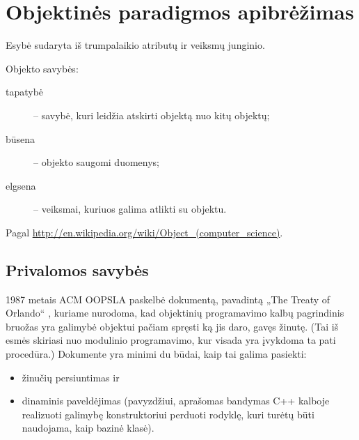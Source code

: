 \chapter{Objektinės paradigmos apibrėžimas}

\begin{defn}[Objektas]
  Esybė sudaryta iš trumpalaikio atributų ir veiksmų junginio.

  Objekto savybės:
  \begin{description}
    \item[tapatybė] – savybė, kuri leidžia atskirti objektą nuo kitų
      objektų;
    \item[būsena] – objekto saugomi duomenys;
    \item[elgsena] – veiksmai, kuriuos galima atlikti su objektu.
  \end{description}

  Pagal \url{http://en.wikipedia.org/wiki/Object_(computer_science)}.
\end{defn}

\section{Privalomos savybės}

1987 metais ACM OOPSLA paskelbė dokumentą, pavadintą „The Treaty of
Orlando“ \cite{Lieberman:1987:TO:62139.62144}, kuriame nurodoma, kad
objektinių programavimo kalbų pagrindinis bruožas yra galimybė objektui
pačiam spręsti ką jis daro, gavęs žinutę. (Tai iš esmės skiriasi nuo
modulinio programavimo, kur visada yra įvykdoma ta pati procedūra.)
Dokumente yra minimi du būdai, kaip tai galima pasiekti:
\begin{itemize}
  \item žinučių persiuntimas  ir
  \item dinaminis paveldėjimas  (pavyzdžiui,
    \cite[272]{cpp-design-evolution} aprašomas bandymas C++
    kalboje realizuoti galimybę konstruktoriui perduoti rodyklę, kuri
    turėtų būti naudojama, kaip bazinė klasė).
\end{itemize}

